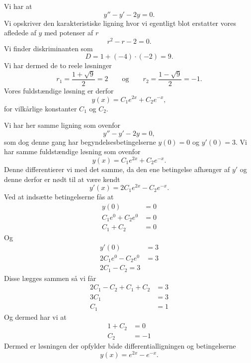\begin{eks}
  Vi har at
  \[
  y''-y'-2y=0
  .\]
  Vi opskriver den karakteristiske ligning hvor vi egentligt blot erstatter vores afledede af $y$ med potenser af $r$
  \[
  r^2 -r-2=0
  .\]
  Vi finder diskriminanten som
  \[
  D = 1+(-4)\cdot (-2) = 9
  .\]
  Vi har dermed de to reele løsninger
  \[
  r_1 = \frac{1+\sqrt{9}}{2} = 2 \qquad \text{og} \qquad r_2 = \frac{1-\sqrt{9} }{2} = -1
  .\]
  Vores fuldstændige løsning er derfor
  \[
  y(x) = C_1e^{2x} + C_2e^{-x} 
  ,\]
  for vilkårlige konstanter $C_1$ og $C_2$.
\end{eks}
\begin{eks}
  Vi har her samme ligning som ovenfor
  \[
  y''-y'-2y = 0
  ,\]
  som dog denne gang har begyndelsesbetingelserne $y(0)=0$ og $y'(0)=3$.
  Vi har samme fuldstændige løsning som ovenfor
  \[
  y(x) = C_1e^{2x} + C_2e^{-x}  
  .\]
  Denne differentierer vi med det samme, da den ene betingelse afhænger af $y'$ og denne derfor er nødt til at være kendt
  \[
  y'(x) = 2C_1e^{2x} - C_2e^{-x} 
  .\]
  Ved at indsætte betingelserne fås at
  \begin{align*}
    y\left( 0 \right) &= 0 \\
    C_1e^{0} + C_2e^{0} &= 0 \\
    C_1 + C_2 &= 0
  \end{align*}
  Og
  \begin{align*}
    y'\left( 0 \right) &= 3 \\
    2C_1e^{0} -C_2e^{0} &= 3 \\ 
    2C_1 - C_2 = 3
  \end{align*}
  Disse lægges sammen så vi får
  \begin{align*}
  2C_1 - C_2 + C_1 + C_2 &= 3 \\
  3C_1 &= 3 \\
  C_1 &= 1
  \end{align*}
  Og dermed har vi at
  \begin{align*}
  1 + C_2 &= 0 \\
  C_2 &= -1
  \end{align*}
  Dermed er løsningen der opfylder både differentialligningen og betingelserne
  \[
  y(x) = e^{2x} -e^{-x} 
  .\]
\end{eks}
